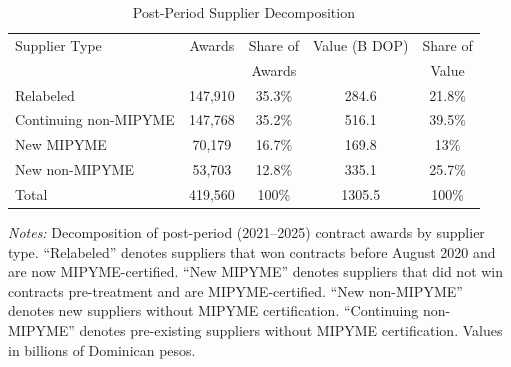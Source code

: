 \begin{table}[t]
\centering
\caption{Post-Period Supplier Decomposition}
\label{tab:decomp}
\begin{tabular}{lcccc}
\hline\hline
Supplier Type & Awards & Share of & Value (B DOP) & Share of \\
 & & Awards & & Value \\
\hline
Relabeled & 147,910 & 35.3\% & 284.6 & 21.8\% \\
Continuing non-MIPYME & 147,768 & 35.2\% & 516.1 & 39.5\% \\
New MIPYME & 70,179 & 16.7\% & 169.8 & 13\% \\
New non-MIPYME & 53,703 & 12.8\% & 335.1 & 25.7\% \\
\hline
Total & 419,560 & 100\% & 1305.5 & 100\% \\
\hline\hline
\end{tabular}
\begin{tablenotes}
\item \textit{Notes:} Decomposition of post-period (2021--2025) contract awards by supplier type. ``Relabeled'' denotes suppliers that won contracts before August 2020 and are now MIPYME-certified. ``New MIPYME'' denotes suppliers that did not win contracts pre-treatment and are MIPYME-certified. ``New non-MIPYME'' denotes new suppliers without MIPYME certification. ``Continuing non-MIPYME'' denotes pre-existing suppliers without MIPYME certification. Values in billions of Dominican pesos.
\end{tablenotes}
\end{table}

